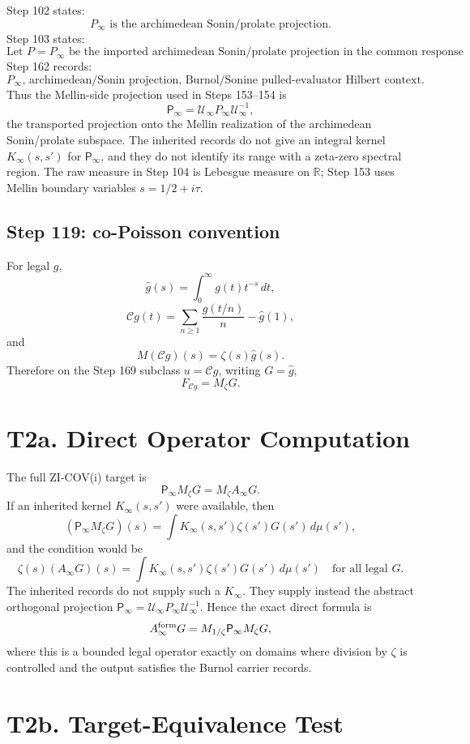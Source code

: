 \documentclass[11pt]{article}
\newcommand{\Psym}{\mathsf P_\infty}
\newcommand{\Mz}{M_\zeta}
\newcommand{\Mell}{M}
\newcommand{\Uinf}{\mathcal U_\infty}
\newcommand{\zetaF}{\zeta}
\newcommand{\Chat}{\mathcal C}
\begin{document}
Step 102 states:
\[
  \text{\(P_\infty\) is the archimedean Sonin/prolate projection.}
\]
Step 103 states:
\[
  \text{Let \(P=P_\infty\) be the imported archimedean Sonin/prolate projection in the common response model.}
\]
Step 162 records:
\[
  \text{\(P_\infty\), archimedean/Sonin projection, Burnol/Sonine pulled-evaluator Hilbert context.}
\]
Thus the Mellin-side projection used in Steps 153--154 is
\[
  \Psym=\Uinf P_\infty\Uinf^{-1},
\]
the transported projection onto the Mellin realization of the archimedean
Sonin/prolate subspace. The inherited records do not give an integral kernel
\(K_\infty(s,s')\) for \(\Psym\), and they do not identify its range with a
zeta-zero spectral region. The raw measure in Step 104 is Lebesgue measure on
\(\mathbb R\); Step 153 uses Mellin boundary variables \(s=1/2+i\tau\).

\subsection*{Step 119: co-Poisson convention}

For legal \(g\),
\[
  \widehat g(s)=\int_0^\infty g(t)t^{-s}\,dt,
\]
\[
  \Chat g(t)=\sum_{n\ge1}\frac{g(t/n)}{n}-\widehat g(1),
\]
and
\[
  \Mell(\Chat g)(s)=\zetaF(s)\widehat g(s).
\]
Therefore on the Step 169 subclass \(u=\Chat g\), writing \(G=\widehat g\),
\[
  F_{\Chat g}=\Mz G.
\]

\section{T2a. Direct Operator Computation}

The full ZI-COV(i) target is
\[
  \Psym\Mz G=\Mz A_\infty G.
\]
If an inherited kernel \(K_\infty(s,s')\) were available, then
\[
  (\Psym\Mz G)(s)
  =
  \int K_\infty(s,s')\zetaF(s')G(s')\,d\mu(s'),
\]
and the condition would be
\[
  \zetaF(s)(A_\infty G)(s)
  =
  \int K_\infty(s,s')\zetaF(s')G(s')\,d\mu(s')
  \quad\text{for all legal }G.
\]
The inherited records do not supply such a \(K_\infty\). They supply instead
the abstract orthogonal projection \(\Psym=\Uinf P_\infty\Uinf^{-1}\). Hence
the exact direct formula is
\[
  A_\infty^{\rm form}G
  =
  M_{1/\zeta}\Psym\Mz G,
\]
where this is a bounded legal operator exactly on domains where division by
\(\zeta\) is controlled and the output satisfies the Burnol carrier records.

\section{T2b. Target-Equivalence Test}
\end{document}
